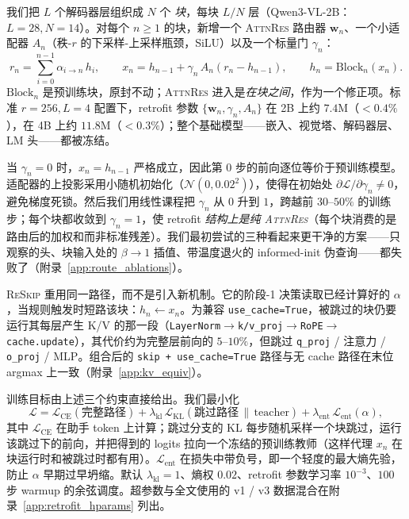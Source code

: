 \documentclass{article}
\newcommand{\attnres}{\textsc{AttnRes}}
\newcommand{\reskip}{\textsc{ReSkip}}
\begin{document}
我们把 $L$ 个解码器层组织成 $N$ 个 \emph{块}，每块 $L/N$ 层（Qwen3-VL-2B：$L{=}28, N{=}14$）。对每个 $n\ge 1$ 的块，新增一个 \attnres{} 路由器 $\mathbf{w}_n$、一个小适配器 $A_n$（秩-$r$ 的下采样-上采样瓶颈，SiLU）以及一个标量门 $\gamma_n$：
\begin{equation}
  r_n = \sum_{i=0}^{n-1} \alpha_{i \to n}\,h_i, \qquad
  x_n = h_{n-1} + \gamma_n\,A_n(r_n - h_{n-1}), \qquad
  h_n = \mathrm{Block}_n(x_n).
  \label{eq:gamma_gate}
\end{equation}
$\mathrm{Block}_n$ 是预训练块，原封不动；\attnres{} 进入是\emph{在块之间}，作为一个修正项。标准 $r{=}256, L{=}4$ 配置下，retrofit 参数 $\{\mathbf{w}_n, \gamma_n, A_n\}$ 在 2B 上约 $7.4$M（$<0.4\%$），在 4B 上约 $11.8$M（$<0.3\%$）；整个基础模型——嵌入、视觉塔、解码器层、LM 头——都被冻结。

当 $\gamma_n{=}0$ 时，$x_n = h_{n-1}$ 严格成立，因此第 $0$ 步的前向逐位等价于预训练模型。适配器的上投影采用小随机初始化（$\mathcal{N}(0,0.02^2)$），使得在初始处 $\partial\mathcal{L}/\partial\gamma_n \ne 0$，避免梯度死锁。然后我们用线性课程把 $\gamma_n$ 从 $0$ 升到 $1$，跨越前 $30$--$50\%$ 的训练步；每个块都收敛到 $\gamma_n{=}1$，使 retrofit \emph{结构上是纯 \attnres{}}（每个块消费的是路由后的加权和而非标准残差）。我们最初尝试的三种看起来更干净的方案——只观察的头、块输入处的 $\beta\to 1$ 插值、带温度退火的 informed-init 伪查询——都失败了（附录~\ref{app:route_ablations}）。

\reskip{} 重用同一路径，而不是引入新机制。它的阶段-1 决策读取已经计算好的 $\alpha$，当规则触发时短路该块：$h_n\!\leftarrow\!x_n$。为兼容 \texttt{use\_cache=True}，被跳过的块仍要运行其每层产生 K/V 的那一段（\texttt{LayerNorm}\!$\to$\!\texttt{k/v\_proj}\!$\to$\!\texttt{RoPE}\!$\to$\!\texttt{cache.update}），其代价约为完整层前向的 $5$--$10\%$，但跳过 \texttt{q\_proj} / 注意力 / \texttt{o\_proj} / MLP。组合后的 \texttt{skip\,+\,use\_cache=True} 路径与无 cache 路径在末位 argmax 上一致（附录~\ref{app:kv_equiv}）。

训练目标由上述三个约束直接给出。我们最小化
\begin{equation}
  \mathcal{L} = \mathcal{L}_{\text{CE}}(\text{完整路径}) + \lambda_{\text{kl}}\,\mathcal{L}_{\text{KL}}(\text{跳过路径}\,\|\,\text{teacher}) + \lambda_{\text{ent}}\,\mathcal{L}_{\text{ent}}(\alpha) ,
  \label{eq:retrofit_loss}
\end{equation}
其中 $\mathcal{L}_{\text{CE}}$ 在助手 token 上计算；跳过分支的 KL 每步随机采样一个块跳过，运行该跳过下的前向，并把得到的 logits 拉向一个冻结的预训练教师（这样代理 $x_n$ 在块运行时和被跳过时都有用）。$\mathcal{L}_{\text{ent}}$ 在损失中带负号，即一个轻度的最大熵先验，防止 $\alpha$ 早期过早坍缩。默认 $\lambda_{\text{kl}}{=}1$、熵权 $0.02$、retrofit 参数学习率 $10^{-3}$、$100$ 步 warmup 的余弦调度。超参数与全文使用的 v1 / v3 数据混合在附录~\ref{app:retrofit_hparams} 列出。
\end{document}
